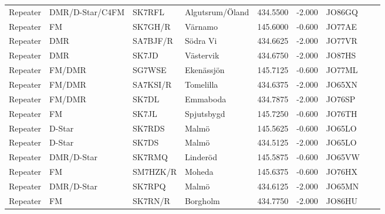 \begin{longtable}{llllrrlcl}
	Repeater & DMR/D-Star/C4FM & SK7RFL   & Algutsrum/Öland         &   434.5500 &   -2.000 & JO86GQ &  \\
	Repeater & FM              & SK7GH/R  & Värnamo                 &   145.6000 &   -0.600 & JO77AE &  \\
	Repeater & DMR             & SA7BJF/R & Södra Vi                &   434.6625 &   -2.000 & JO77VR &  \\
	Repeater & DMR             & SK7JD    & Västervik               &   434.6750 &   -2.000 & JO87HS &  \\
	Repeater & FM/DMR          & SG7WSE   & Ekenässjön              &   145.7125 &   -0.600 & JO77ML &  \\
	Repeater & FM/DMR          & SA7KSI/R & Tomelilla               &   434.6375 &   -2.000 & JO65XN &  \\
	Repeater & FM/DMR          & SK7DL    & Emmaboda                &   434.7875 &   -2.000 & JO76SP &  \\
	Repeater & FM              & SK7JL    & Spjutsbygd              &   145.7250 &   -0.600 & JO76TH &  \\
	Repeater & D-Star          & SK7RDS   & Malmö                   &   145.5625 &   -0.600 & JO65LO &  \\
	Repeater & D-Star          & SK7DS    & Malmö                   &   434.5125 &   -2.000 & JO65LO &  \\
	Repeater & DMR/D-Star      & SK7RMQ   & Linderöd                &   145.5875 &   -0.600 & JO65VW &  \\
	Repeater & FM              & SM7HZK/R & Moheda                  &   145.6375 &   -0.600 & JO76HX &  \\
	Repeater & DMR/D-Star      & SK7RPQ   & Malmö                   &   434.6125 &   -2.000 & JO65MN &  \\
	Repeater & FM              & SK7RN/R  & Borgholm                &   434.7750 &   -2.000 & JO86HU &
\end{longtable}

\normalsize
